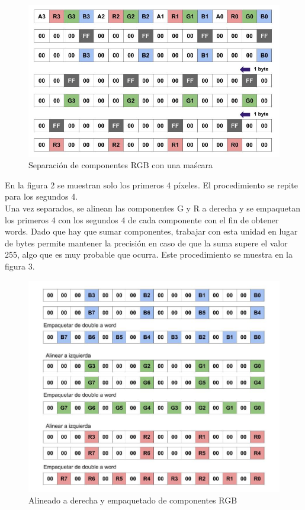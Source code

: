 \documentclass[a4paper]{article}
\begin{document}
\begin{figure}[h]
  \begin{center}
	\includegraphics[scale=0.4]{img/ocultar/SepararComponentes.jpg}
	\caption{Separación de componentes RGB con una maścara}
  \end{center}
\end{figure}

En la figura 2 se muestran solo los primeros 4 píxeles. El procedimiento se repite para los segundos 4. \\
Una vez separados, se alinean las componentes G y R a derecha y se empaquetan los primeros 4 con los segundos 4 de cada componente con el fin de obtener words. Dado que hay que sumar componentes, trabajar con esta unidad en lugar de bytes permite mantener la precisión en caso de que la suma supere el valor 255, algo que es muy probable que ocurra. Este procedimiento se muestra en la figura 3.

\pagebreak

\begin{figure}[h]
  \begin{center}
	\includegraphics[scale=0.4]{img/ocultar/AlinearYEmpaquetar.jpg}
	\caption{Alineado a derecha y empaquetado de componentes RGB}
  \end{center}
\end{figure}
\end{document}
